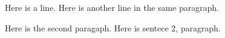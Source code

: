 \documentclass{article}
\begin{document}
Here is a line.
Here is another line in the same paragraph.

Here is the second paragaph.
Here is sentece 2, paragraph.
\end{document}

